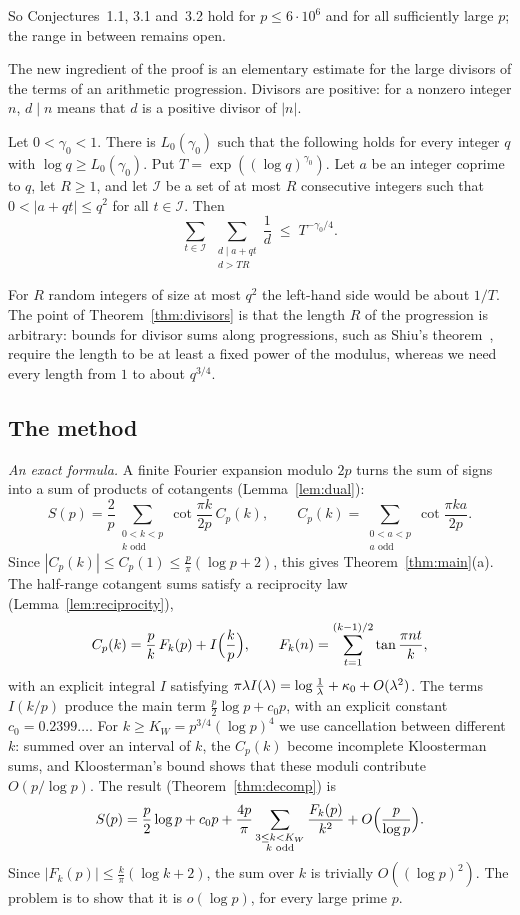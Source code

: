 So Conjectures~1.1, 3.1 and~3.2 hold for $p\le6\cdot10^6$ and for all sufficiently large $p$; the range in between remains open.

The new ingredient of the proof is an elementary estimate for the large divisors of the terms of an arithmetic progression. Divisors are positive: for a nonzero integer $n$, $d\mid n$ means that $d$ is a positive divisor of $|n|$.

\begin{theorem}\label{thm:divisors}
Let $0<\gamma_0<1$. There is $L_0(\gamma_0)$ such that the following holds for every integer $q$ with $\log q\ge L_0(\gamma_0)$. Put $T=\exp((\log q)^{\gamma_0})$. Let $a$ be an integer coprime to $q$, let $R\ge1$, and let $\mathcal I$ be a set of at most $R$ consecutive integers such that $0<|a+qt|\le q^2$ for all $t\in\mathcal I$. Then
\[
\sum_{t\in\mathcal I}\ \sum_{\substack{d\mid a+qt\\ d>TR}}\frac1d\;\le\;T^{-\gamma_0/4}.
\]
\end{theorem}

For $R$ random integers of size at most $q^2$ the left-hand side would be about $1/T$. The point of Theorem~\ref{thm:divisors} is that the length $R$ of the progression is arbitrary: bounds for divisor sums along progressions, such as Shiu's theorem~\cite{b24}, require the length to be at least a fixed power of the modulus, whereas we need every length from $1$ to about $q^{3/4}$.

\subsection{The method}
\emph{An exact formula.} A finite Fourier expansion modulo $2p$ turns the sum of signs into a sum of products of cotangents (Lemma~\ref{lem:dual}):
\[
S(p)=\frac2p\sum_{\substack{0<k<p\\ k\text{ odd}}}\cot\frac{\pi k}{2p}\,C_p(k),\qquad C_p(k)=\sum_{\substack{0<a<p\\ a\text{ odd}}}\cot\frac{\pi ka}{2p}.
\]
Since $|C_p(k)|\le C_p(1)\le\frac p\pi(\log p+2)$, this gives Theorem~\ref{thm:main}(a). The half-range cotangent sums satisfy a reciprocity law (Lemma~\ref{lem:reciprocity}),
\[
C_p(k)=\frac pk\,F_k(p)+I\Bigl(\frac kp\Bigr),\qquad F_k(n)=\sum_{t=1}^{(k-1)/2}\tan\frac{\pi nt}k,
\]
with an explicit integral $I$ satisfying $\pi\lambda I(\lambda)=\log\frac1\lambda+\kappa_0+O(\lambda^2)$. The terms $I(k/p)$ produce the main term $\frac p2\log p+c_0p$, with an explicit constant $c_0=0.2399\ldots$. For $k\ge K_W=p^{3/4}(\log p)^4$ we use cancellation between different $k$: summed over an interval of $k$, the $C_p(k)$ become incomplete Kloosterman sums, and Kloosterman's bound shows that these moduli contribute $O(p/\log p)$. The result (Theorem~\ref{thm:decomp}) is
\begin{equation}\label{eq:intro-decomp}
S(p)=\frac p2\log p+c_0p+\frac{4p}\pi\sum_{\substack{3\le k<K_W\\ k\text{ odd}}}\frac{F_k(p)}{k^2}+O\Bigl(\frac p{\log p}\Bigr).
\end{equation}
Since $|F_k(p)|\le\frac k\pi(\log k+2)$, the sum over $k$ is trivially $O((\log p)^2)$. The problem is to show that it is $o(\log p)$, for every large prime $p$.

